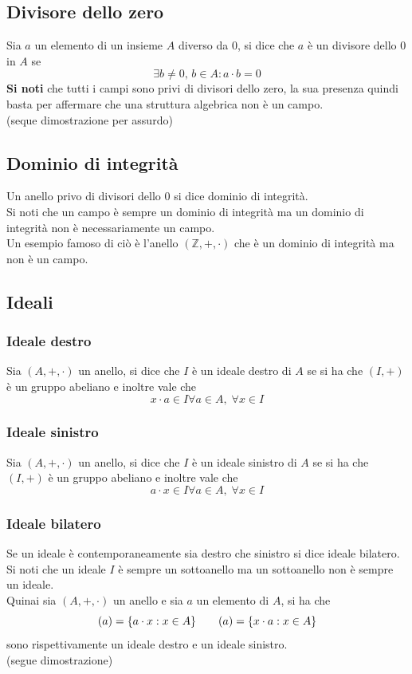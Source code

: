 \begin{flushleft}
\subsection{Divisore dello zero}
Sia $a$ un elemento di un insieme $A$ diverso da 0, si dice che $a$ è un divisore dello 0 in $A$ se
\[\exists b \neq 0,\,b\in A: a\cdot b = 0\]
\textbf{Si noti} che tutti i campi sono privi di divisori dello zero, la sua presenza quindi basta per affermare che una struttura algebrica non è un campo.\\
(seque dimostrazione per assurdo)

\subsection{Dominio di integrità}
Un anello privo di divisori dello 0 si dice dominio di integrità.\\
Si noti che un campo è sempre un dominio di integrità ma un dominio di integrità non è necessariamente un campo.\\
Un esempio famoso di ciò è l'anello $(\mathbb{Z}, +, \cdot)$ che è un dominio di integrità ma non è un campo.

\subsection{Ideali}


\subsubsection{Ideale destro}
Sia $(A, +, \cdot)$ un anello, si dice che $I$ è un ideale destro di $A$ se si ha che $(I, +)$ è un gruppo abeliano e inoltre vale che
\[x\cdot a \in I \forall a \in A,\;\forall x\in I\]

\subsubsection{Ideale sinistro}
Sia $(A, +, \cdot)$ un anello, si dice che $I$ è un ideale sinistro di $A$ se si ha che $(I, +)$ è un gruppo abeliano e inoltre vale che
\[a\cdot x \in I \forall a \in A,\;\forall x\in I\]

\subsubsection{Ideale bilatero}
Se un ideale è contemporaneamente sia destro che sinistro si dice ideale bilatero.\\
Si noti che un ideale $I$ è sempre un sottoanello ma un sottoanello non è sempre un ideale.\\
Quinai sia $(A, +, \cdot)$ un anello e sia $a$ un elemento di $A$, si ha che
\[(a) = \{a\cdot x: x\in A\}\hspace{20px}(a) = \{x\cdot a: x\in A\}\]
sono rispettivamente un ideale destro e un ideale sinistro.\\
(segue dimostrazione)
\\ \vspace{300px}


\end{flushleft}
